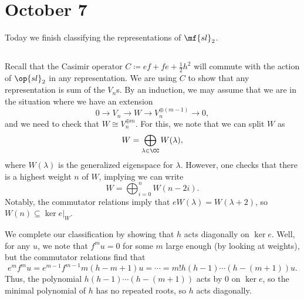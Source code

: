 \documentclass[../notes.tex]{subfiles}
\begin{document}
\section{October 7}
Today we finish classifying the representations of $\mf{sl}_2$.

\subsection{}
Recall that the Casimir operator $C\coloneqq ef+fe+\frac12h^2$ will commute with the action of $\op{sl}_2$ in any representation. We are using $C$ to show that any representation is sum of the $V_n$s. By an induction, we may assume that we are in the situation where we have an extension
\[0\to V_n\to W\to V_n^{\oplus(m-1)}\to0,\]
and we need to check that $W\cong V_n^{\oplus m}$. For this, we note that we can split $W$ as
\[W=\bigoplus_{\lambda\in\CC}W(\lambda),\]
where $W(\lambda)$ is the generalized eigenspace for $\lambda$. However, one checks that there is a highest weight $n$ of $W$, implying we can write
\[W=\bigoplus_{i=0}^nW(n-2i).\]
Notably, the commutator relations imply that $eW(\lambda)=W(\lambda+2)$, so $W(n)\subseteq\ker e|_W$.

We complete our classification by showing that $h$ acts diagonally on $\ker e$. Well, for any $u$, we note that $f^mu=0$ for some $m$ large enough (by looking at weights), but the commutator relations find that
\[e^mf^mu=e^{m-1}f^{m-1}m(h-m+1)u=\cdots=m!h(h-1)\cdots(h-(m+1))u.\]
Thus, the polynomial $h(h-1)\cdots(h-(m+1))$ acts by $0$ on $\ker e$, so the minimal polynomial of $h$ has no repeated roots, so $h$ acts diagonally.
\end{document}
